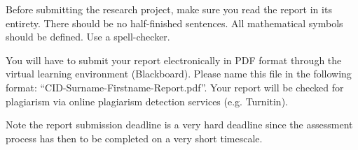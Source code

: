 Before submitting the research project, make sure you read the report in its entirety. There should be no half-finished sentences. All mathematical symbols should be defined. Use a spell-checker.

You will have to submit your report electronically in PDF format through the virtual learning environment (Blackboard). Please name this file in the following format: “CID-Surname-Firstname-Report.pdf”. Your report will be checked for plagiarism via online plagiarism detection services (e.g. Turnitin). 

Note the report submission deadline is a very hard deadline since the assessment process has then to be completed on a very short timescale.
